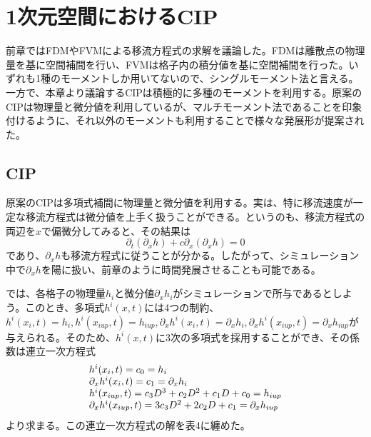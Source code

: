 \documentclass[dvipdfmx, 9pt, a4paper]{jsarticle}
\begin{document}
\section{1次元空間におけるCIP}
前章ではFDMやFVMによる移流方程式の求解を議論した。FDMは離散点の物理量を基に空間補間を行い、FVMは格子内の積分値を基に空間補間を行った。いずれも1種のモーメントしか用いてないので、シングルモーメント法と言える。一方で、本章より議論するCIPは積極的に多種のモーメントを利用する。原案のCIPは物理量と微分値を利用しているが、マルチモーメント法であることを印象付けるように、それ以外のモーメントも利用することで様々な発展形が提案された。

\subsection{CIP}
原案のCIPは多項式補間に物理量と微分値を利用する。実は、特に移流速度が一定な移流方程式は微分値を上手く扱うことができる。というのも、移流方程式の両辺を$x$で偏微分してみると、その結果は
\begin{equation}
\partial_t(\partial_xh)+c\partial_x(\partial_xh)=0
\end{equation}
であり、$\partial_xh$も移流方程式に従うことが分かる。したがって、シミュレーション中で$\partial_xh$を陽に扱い、前章のように時間発展させることも可能である。\par
では、各格子の物理量$h_i$と微分値$\partial_xh_i$がシミュレーションで所与であるとしよう。このとき、多項式$h^i(x, t)$には4つの制約、$h^i(x_i, t)=h_i, h^i(x_{iup}, t)=h_{iup}, \partial_xh^i(x_i, t)=\partial_xh_i, \partial_xh^i(x_{iup}, t)=\partial_xh_{iup}$が与えられる。そのため、$h^i(x, t)$に3次の多項式を採用することができ、その係数は連立一次方程式
\begin{equation}
\begin{array}{l}
h^i(x_i, t)=c_0=h_i \\
\partial_xh^i(x_i, t)=c_1=\partial_xh_i \\
h^i(x_{iup}, t)=c_3D^3+c_2D^2+c_1D+c_0=h_{iup} \\
\partial_xh^i(x_{iup}, t)=3c_3D^2+2c_2D+c_1=\partial_xh_{iup} \\
\end{array} \notag
\end{equation}
より求まる。この連立一次方程式の解を表4に纏めた。\par
\end{document}
